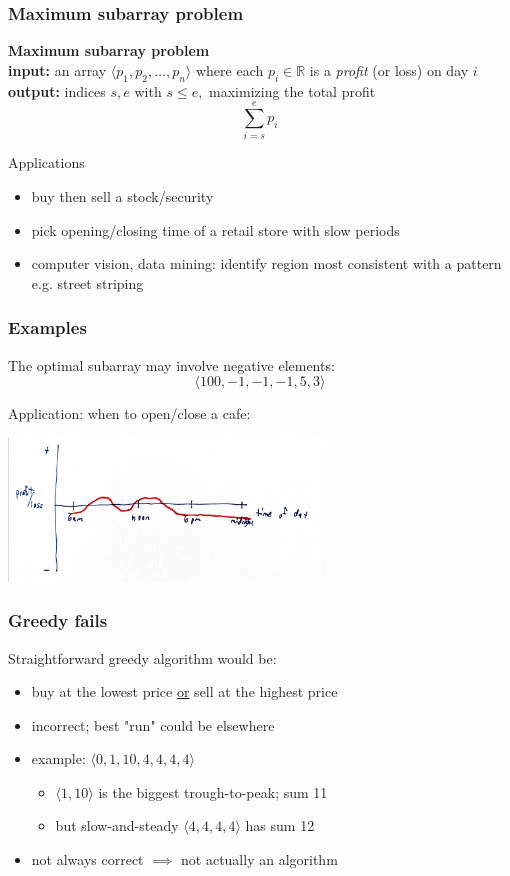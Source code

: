 \documentclass[10pt,aspectratio=169]{beamer}
\begin{document}
\begin{frame} \frametitle{Maximum subarray problem}
  \textbf{Maximum subarray problem} \\
  \textbf{input: } an array $\langle p_1, p_2, \ldots, p_n \rangle$ where each
    $p_i \in \mathbb{R}$ is a \emph{profit} (or loss) on day $i$ \\
  \textbf{output: } indices $s, e$ with $s \leq e,$ maximizing the total profit
    \[ \sum_{i=s}^e p_i \]

  Applications
  \begin{itemize}
    \item buy then sell a stock/security
    \item pick opening/closing time of a retail store with slow periods
    \item computer vision, data mining: identify region most consistent with
      a pattern e.g. street striping
  \end{itemize}
\end{frame}

\begin{frame} \frametitle{Examples}
  The optimal subarray may involve negative elements:
  \[ \langle 100, -1, -1, -1, 5, 3 \rangle \]

  Application: when to open/close a cafe:
  \begin{center}
    \includegraphics[height=1.5in]{profit-loss.jpg}
  \end{center}
\end{frame}

\begin{frame} \frametitle{Greedy fails}
  Straightforward greedy algorithm would be:
  \begin{itemize}
    \item buy at the lowest price \underline{or} sell at the highest price
    \item incorrect; best "run" could be elsewhere
    \item example: $\langle 0, 1, 10, 4, 4, 4, 4\rangle$
      \begin{itemize}
      \item $\langle 1, 10 \rangle$ is the biggest trough-to-peak; sum 11
      \item but slow-and-steady $\langle 4, 4, 4, 4\rangle$ has sum 12
        \end{itemize}
    \item not always correct $\implies$ not actually an algorithm
  \end{itemize}

\end{frame}
\end{document}
